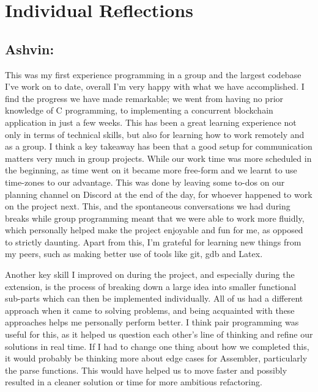\documentclass[a4paper]{article}
\begin{document}
\section{Individual Reflections}
\subsection{Ashvin:}
This was my first experience programming in a group and the largest codebase I've work on to date, overall I'm very happy with what we have accomplished. I find the progress we have made remarkable;  we went from having no prior knowledge of C programming, to implementing a concurrent blockchain application in just a few weeks. This has been a great learning experience not only in terms of technical skills, but also for learning how to work remotely and as a group. I think a key takeaway has been that a good setup for communication matters very much in group projects. While our work time was more scheduled in the beginning, as time went on it became more free-form and we learnt to use time-zones to our advantage. This was done by leaving some to-dos on our planning channel on Discord at the end of the day, for whoever happened to work on the project next. This, and the spontaneous conversations we had during breaks while group programming meant that we were able to work more fluidly, which personally helped make the project enjoyable and fun for me, as opposed to strictly daunting. Apart from this, I'm grateful for learning new things from my peers, such as making better use of tools like git, gdb and Latex.

Another key skill I improved on during the project, and especially during the extension, is the process of breaking down a large idea into smaller functional sub-parts which can then be implemented individually. All of us had a different approach when it came to solving problems, and being acquainted with these approaches helps me personally perform better. I think pair programming was useful for this, as it helped us question each other's line of thinking and refine our solutions in real time. If I had to change one thing about how we completed this, it would probably be thinking more about edge cases for Assembler, particularly the parse functions. This would have helped us to move faster and possibly resulted in a cleaner solution or time for more ambitious refactoring.
\end{document}
